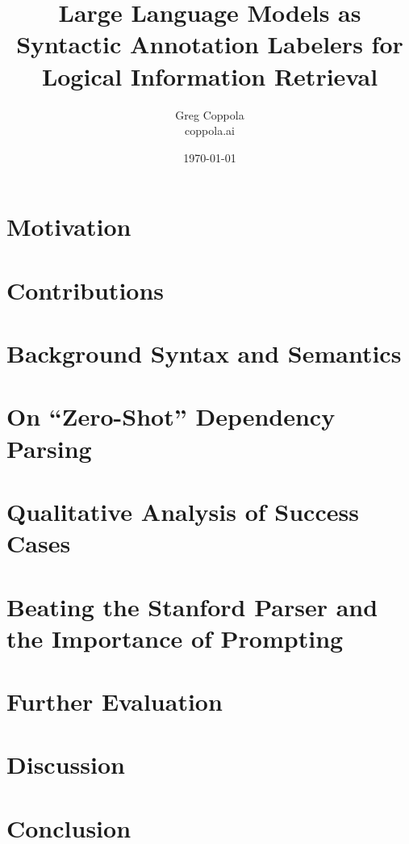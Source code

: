 \documentclass[11pt]{article}
\title{Large Language Models as Syntactic Annotation Labelers for Logical Information Retrieval}
\author{Greg Coppola\\coppola.ai}
\date{\today}
\begin{document}
\maketitle



\section{Motivation}


\section{Contributions}


\section{ Background Syntax and Semantics}



\section{On ``Zero-Shot'' Dependency Parsing}


\section{Qualitative Analysis of Success Cases}

\section{Beating the Stanford Parser and the Importance of Prompting}



\section{Further Evaluation}


\section{Discussion}


\section{Conclusion}




\end{document}
